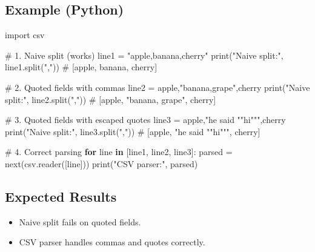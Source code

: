 \documentclass[
  letterpaper,
  DIV=11,
  numbers=noendperiod]{scrreprt}
\newenvironment{Shaded}{\begin{snugshade}}{\end{snugshade}}
\newcommand{\BuiltInTok}[1]{\textcolor[rgb]{0.00,0.23,0.31}{#1}}
\newcommand{\CommentTok}[1]{\textcolor[rgb]{0.37,0.37,0.37}{#1}}
\newcommand{\ControlFlowTok}[1]{\textcolor[rgb]{0.00,0.23,0.31}{\textbf{#1}}}
\newcommand{\ImportTok}[1]{\textcolor[rgb]{0.00,0.46,0.62}{#1}}
\newcommand{\KeywordTok}[1]{\textcolor[rgb]{0.00,0.23,0.31}{\textbf{#1}}}
\newcommand{\NormalTok}[1]{\textcolor[rgb]{0.00,0.23,0.31}{#1}}
\newcommand{\OperatorTok}[1]{\textcolor[rgb]{0.37,0.37,0.37}{#1}}
\newcommand{\StringTok}[1]{\textcolor[rgb]{0.13,0.47,0.30}{#1}}
\providecommand{\tightlist}{%
  \setlength{\itemsep}{0pt}\setlength{\parskip}{0pt}}
\begin{document}
\subsection{Example (Python)}\label{example-python-4}

\begin{Shaded}
\begin{Highlighting}[]
\ImportTok{import}\NormalTok{ csv}

\CommentTok{\# 1. Naive split (works)}
\NormalTok{line1 }\OperatorTok{=} \StringTok{"apple,banana,cherry"}
\BuiltInTok{print}\NormalTok{(}\StringTok{"Naive split:"}\NormalTok{, line1.split(}\StringTok{","}\NormalTok{))  }\CommentTok{\# [\textquotesingle{}apple\textquotesingle{}, \textquotesingle{}banana\textquotesingle{}, \textquotesingle{}cherry\textquotesingle{}]}

\CommentTok{\# 2. Quoted fields with commas}
\NormalTok{line2 }\OperatorTok{=} \StringTok{\textquotesingle{}apple,"banana,grape",cherry\textquotesingle{}}
\BuiltInTok{print}\NormalTok{(}\StringTok{"Naive split:"}\NormalTok{, line2.split(}\StringTok{","}\NormalTok{))  }\CommentTok{\# [\textquotesingle{}apple\textquotesingle{}, \textquotesingle{}"banana\textquotesingle{}, \textquotesingle{}grape"\textquotesingle{}, \textquotesingle{}cherry\textquotesingle{}]}

\CommentTok{\# 3. Quoted fields with escaped quotes}
\NormalTok{line3 }\OperatorTok{=} \StringTok{\textquotesingle{}apple,"he said ""hi""",cherry\textquotesingle{}}
\BuiltInTok{print}\NormalTok{(}\StringTok{"Naive split:"}\NormalTok{, line3.split(}\StringTok{","}\NormalTok{))  }\CommentTok{\# [\textquotesingle{}apple\textquotesingle{}, \textquotesingle{}"he said ""hi"""\textquotesingle{}, \textquotesingle{}cherry\textquotesingle{}]}

\CommentTok{\# 4. Correct parsing}
\ControlFlowTok{for}\NormalTok{ line }\KeywordTok{in}\NormalTok{ [line1, line2, line3]:}
\NormalTok{    parsed }\OperatorTok{=} \BuiltInTok{next}\NormalTok{(csv.reader([line]))}
    \BuiltInTok{print}\NormalTok{(}\StringTok{"CSV parser:"}\NormalTok{, parsed)}
\end{Highlighting}
\end{Shaded}

\subsection{Expected Results}\label{expected-results-5}

\begin{itemize}
\tightlist
\item
  Naive split fails on quoted fields.
\item
  CSV parser handles commas and quotes correctly.
\end{itemize}
\end{document}

